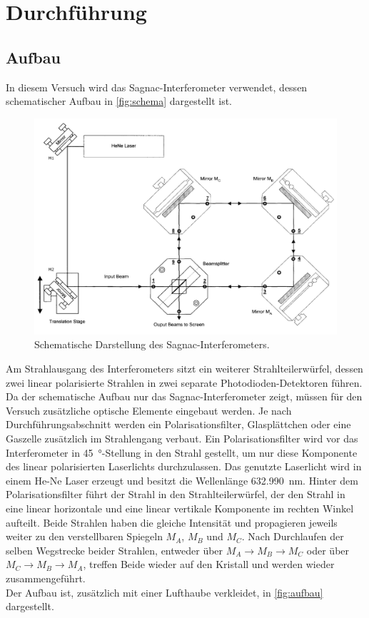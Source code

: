 \newpage
\section{Durchführung}
\label{sec:durchfuehrung}

\subsection{Aufbau}
In diesem Versuch wird das Sagnac-Interferometer verwendet, dessen schematischer Aufbau in \autoref{fig:schema} dargestellt ist.

\begin{figure}[H]
    \centering
    \includegraphics[scale=0.37]{images/aufbau_schema.png}
    \caption{Schematische Darstellung des Sagnac-Interferometers.\cite{V64}}
    \label{fig:schema}
\end{figure}

Am Strahlausgang des Interferometers sitzt ein weiterer Strahlteilerwürfel, dessen zwei linear polarisierte Strahlen in zwei separate Photodioden-Detektoren führen.
Da der schematische Aufbau nur das Sagnac-Interferometer zeigt, müssen für den Versuch zusätzliche optische Elemente eingebaut werden.
Je nach Durchführungsabschnitt werden ein Polarisationsfilter, Glasplättchen oder eine Gaszelle zusätzlich im Strahlengang verbaut.
Ein Polarisationsfilter wird vor das Interferometer in \SI{45}{\degree}-Stellung in den Strahl gestellt, um nur diese Komponente des linear polarisierten Laserlichts durchzulassen.
Das genutzte Laserlicht wird in einem He-Ne Laser erzeugt und besitzt die Wellenlänge \SI{632.990}{\nano\metre}.
Hinter dem Polarisationsfilter führt der Strahl in den Strahlteilerwürfel, der den Strahl in eine linear horizontale und eine linear vertikale Komponente im rechten Winkel aufteilt.
Beide Strahlen haben die gleiche Intensität und propagieren jeweils weiter zu den verstellbaren Spiegeln $M_A$, $M_B$ und $M_C$.
Nach Durchlaufen der selben Wegstrecke beider Strahlen, entweder über $M_A \rightarrow M_B \rightarrow M_C$ oder über $M_C \rightarrow M_B \rightarrow M_A$, treffen Beide wieder auf den Kristall und werden wieder zusammengeführt.\\
Der Aufbau ist, zusätzlich mit einer Lufthaube verkleidet, in \autoref{fig:aufbau} dargestellt.

